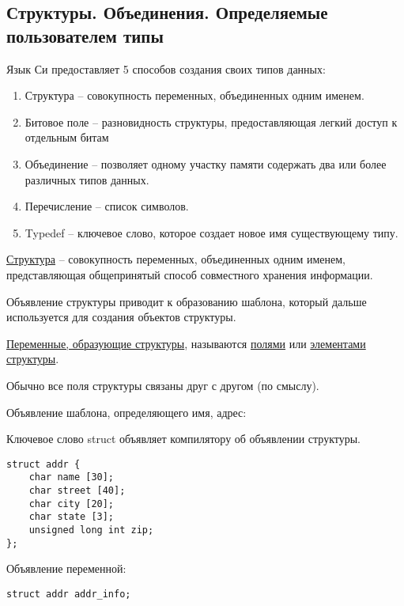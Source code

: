 \subsection{Структуры. Объединения. Определяемые пользователем типы}

Язык Си предоставляет 5 способов создания своих типов данных:

\begin{enumerate}
\item Структура
    – совокупность переменных, объединенных одним именем.

\item Битовое поле
    – разновидность структуры, предоставляющая легкий доступ к отдельным битам

\item Объединение
    – позволяет одному участку памяти содержать два или более различных типов данных.

\item Перечисление
    – список символов.

\item Typedef
    – ключевое слово, которое создает новое имя существующему типу.

\end{enumerate}

\underline{Структура} – совокупность переменных, объединенных одним именем, представляющая общепринятый способ совместного хранения информации. 

Объявление структуры приводит к образованию шаблона, который дальше используется для создания объектов структуры.


\underline{Переменные, образующие структуры}, называются \underline{полями} или \underline{элементами структуры}.


Обычно все поля структуры связаны друг с другом (по смыслу).

Объявление шаблона, определяющего имя, адрес: 


Ключевое слово struct объявляет компилятору об объявлении структуры. 

\begin{verbatim}
struct addr { 
    char name [30];
    char street [40];
    char city [20];
    char state [3];
    unsigned long int zip;
};
\end{verbatim}

Объявление переменной:

\begin{verbatim}
struct addr addr_info;
\end{verbatim}


